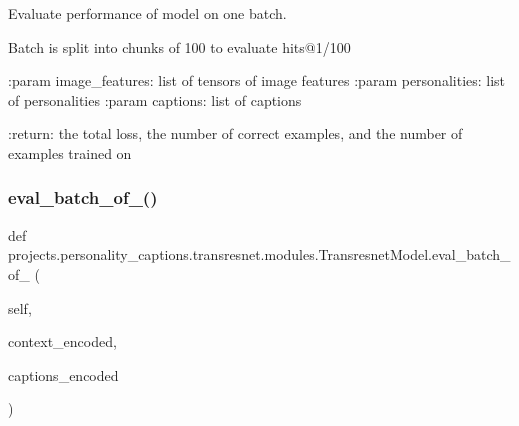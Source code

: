\begin{DoxyVerb}Evaluate performance of model on one batch.

Batch is split into chunks of 100 to evaluate hits@1/100

:param image_features:
    list of tensors of image features
:param personalities:
    list of personalities
:param captions:
    list of captions

:return:
    the total loss, the number of correct examples, and the number of
    examples trained on
\end{DoxyVerb}
 \mbox{\label{classprojects_1_1personality__captions_1_1transresnet_1_1modules_1_1TransresnetModel_a0d96cec932912a3e06a44dc95259010a}} 
\subsubsection{\texorpdfstring{eval\+\_\+batch\+\_\+of\+\_()}{eval\_batch\_of\_100()}}
{\footnotesize\ttfamily def projects.\+personality\+\_\+captions.\+transresnet.\+modules.\+Transresnet\+Model.\+eval\+\_\+batch\+\_\+of\+\_ (\begin{DoxyParamCaption}\item[{}]{self,  }\item[{}]{context\+\_\+encoded,  }\item[{}]{captions\+\_\+encoded }\end{DoxyParamCaption})}

